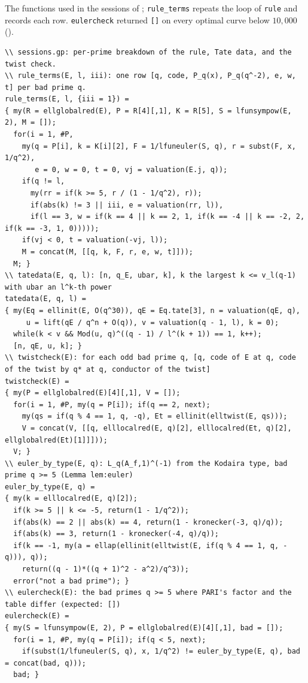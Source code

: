 \begin{sloppypar}
\begin{construction}\label{con:computation:sessions}
The functions used in the sessions of ; \texttt{rule\_terms} repeats the loop of
\texttt{rule} and records each row. \texttt{eulercheck} returned \texttt{[]} on every optimal curve below $10{,}000$ ().
\begin{lstlisting}[language=GP,basicstyle=\ttfamily\scriptsize]
\\ sessions.gp: per-prime breakdown of the rule, Tate data, and the twist check.
\\ rule_terms(E, l, iii): one row [q, code, P_q(x), P_q(q^-2), e, w, t] per bad prime q.
rule_terms(E, l, {iii = 1}) =
{ my(R = ellglobalred(E), P = R[4][,1], K = R[5], S = lfunsympow(E, 2), M = []);
  for(i = 1, #P,
    my(q = P[i], k = K[i][2], F = 1/lfuneuler(S, q), r = subst(F, x, 1/q^2),
       e = 0, w = 0, t = 0, vj = valuation(E.j, q));
    if(q != l,
      my(rr = if(k >= 5, r / (1 - 1/q^2), r));
      if(abs(k) != 3 || iii, e = valuation(rr, l)),
      if(l == 3, w = if(k == 4 || k == 2, 1, if(k == -4 || k == -2, 2, if(k == -3, 1, 0)))));
    if(vj < 0, t = valuation(-vj, l));
    M = concat(M, [[q, k, F, r, e, w, t]]));
  M; }
\\ tatedata(E, q, l): [n, q_E, ubar, k], k the largest k <= v_l(q-1) with ubar an l^k-th power
tatedata(E, q, l) =
{ my(Eq = ellinit(E, O(q^30)), qE = Eq.tate[3], n = valuation(qE, q),
     u = lift(qE / q^n + O(q)), v = valuation(q - 1, l), k = 0);
  while(k < v && Mod(u, q)^((q - 1) / l^(k + 1)) == 1, k++);
  [n, qE, u, k]; }
\\ twistcheck(E): for each odd bad prime q, [q, code of E at q, code of the twist by q* at q, conductor of the twist]
twistcheck(E) =
{ my(P = ellglobalred(E)[4][,1], V = []);
  for(i = 1, #P, my(q = P[i]); if(q == 2, next);
    my(qs = if(q % 4 == 1, q, -q), Et = ellinit(elltwist(E, qs)));
    V = concat(V, [[q, elllocalred(E, q)[2], elllocalred(Et, q)[2], ellglobalred(Et)[1]]]));
  V; }
\\ euler_by_type(E, q): L_q(A_f,1)^(-1) from the Kodaira type, bad prime q >= 5 (Lemma lem:euler)
euler_by_type(E, q) =
{ my(k = elllocalred(E, q)[2]);
  if(k >= 5 || k <= -5, return(1 - 1/q^2));
  if(abs(k) == 2 || abs(k) == 4, return(1 - kronecker(-3, q)/q));
  if(abs(k) == 3, return(1 - kronecker(-4, q)/q));
  if(k == -1, my(a = ellap(ellinit(elltwist(E, if(q % 4 == 1, q, -q))), q));
    return((q - 1)*((q + 1)^2 - a^2)/q^3));
  error("not a bad prime"); }
\\ eulercheck(E): the bad primes q >= 5 where PARI's factor and the table differ (expected: [])
eulercheck(E) =
{ my(S = lfunsympow(E, 2), P = ellglobalred(E)[4][,1], bad = []);
  for(i = 1, #P, my(q = P[i]); if(q < 5, next);
    if(subst(1/lfuneuler(S, q), x, 1/q^2) != euler_by_type(E, q), bad = concat(bad, q)));
  bad; }
\end{lstlisting}
\end{construction}


\end{sloppypar}
